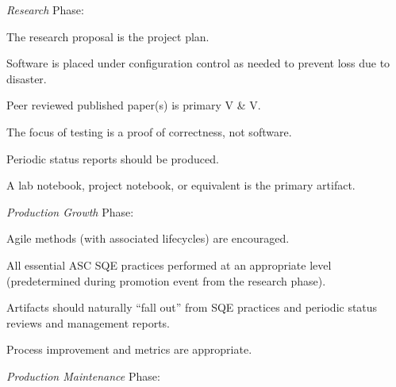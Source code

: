 \documentclass[11pt]{SANDreport}
\begin{document}
\begin{compactitem}

{}\item\textit{Research} Phase:

  \begin{compactitem}

  {}\item The research proposal is the project plan.

  {}\item Software is placed under configuration control as needed to
  prevent loss due to disaster.

  {}\item Peer reviewed published paper(s) is primary V \& V.

  {}\item The focus of testing is a proof of correctness, not
  software.

  {}\item Periodic status reports should be produced.

  {}\item A lab notebook, project notebook, or equivalent is the
  primary artifact.
  
  \end{compactitem}

{}\item\textit{Production Growth} Phase:

  \begin{compactitem}

  {}\item Agile methods (with associated lifecycles) are encouraged.

  {}\item All essential ASC SQE practices performed at an appropriate
  level (predetermined during promotion event from the research
  phase).

  {}\item Artifacts should naturally ``fall out'' from SQE practices
  and periodic status reviews and management reports.

  {}\item Process improvement and metrics are appropriate.
  
  \end{compactitem}

{}\item\textit{Production Maintenance} Phase:

  \begin{compactitem}


\end{compactitem}
\end{compactitem}
\end{document}

